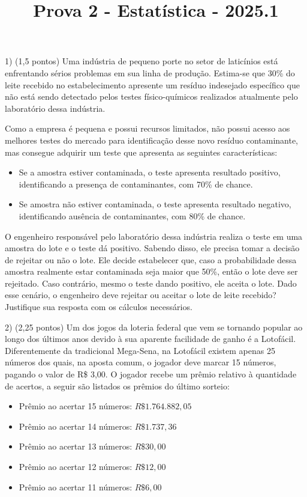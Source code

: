 \documentclass[12pt]{article}
\title{Prova 2 - Estatística - 2025.1}
\begin{document}
\date{}
\maketitle

1) (1,5 pontos) Uma  indústria de pequeno porte no setor de laticínios  está enfrentando sérios problemas em sua linha de produção.
 Estima-se que 30\% do leite recebido no estabelecimento apresente um resíduo indesejado específico que não está sendo detectado pelos testes físico-químicos realizados atualmente pelo laboratório dessa indústria. 

Como a empresa é pequena e possui recursos limitados, não possui acesso aos melhores testes do mercado para identificação desse novo resíduo contaminante,
mas consegue adquirir um teste que apresenta as seguintes características:
 
\begin{itemize}
    \item Se a amostra estiver contaminada, o teste apresenta resultado positivo, identificando a presença de contaminantes, com 70\% de chance.
    \item Se amostra não estiver contaminada, o teste apresenta resultado negativo, identificando ausência de contaminantes, com 80\% de chance.
\end{itemize}

O engenheiro responsável pelo laboratório dessa indústria realiza o teste em uma amostra do lote e o teste dá positivo. 
Sabendo disso, ele precisa tomar a decisão de rejeitar ou não o lote. 
Ele decide estabelecer que, caso a probabilidade dessa amostra realmente estar contaminada seja maior que 50\%, então o lote deve ser rejeitado.
Caso contrário, mesmo o teste dando positivo, ele aceita o lote. Dado esse cenário, o engenheiro deve rejeitar ou aceitar o lote de leite recebido? Justifique sua resposta com os cálculos necessários. 


\vspace{5px}

2) (2,25 pontos) Um dos jogos da loteria federal que vem se tornando popular ao longo dos últimos anos devido à sua aparente facilidade de ganho é a Lotofácil.
 Diferentemente da tradicional Mega-Sena, na Lotofácil existem apenas 25 números dos quais, na aposta comum, o jogador
deve marcar 15 números, pagando o valor de R\$ 3,00. O jogador recebe um prêmio relativo à quantidade de acertos, a seguir são listados os prêmios do último sorteio:
\begin{itemize}
    \item Prêmio ao acertar 15 números: 	$R\$ 1.764.882,05$
    \item Prêmio ao acertar 14 números: 	$R\$ 1.737,36$
    \item Prêmio ao acertar 13 números: 	$R\$ 30,00$
    \item Prêmio ao acertar 12 números: 	$R\$ 12,00$
    \item Prêmio ao acertar 11 números: 	$R\$ 6,00$ 
\end{itemize}
\end{document}
